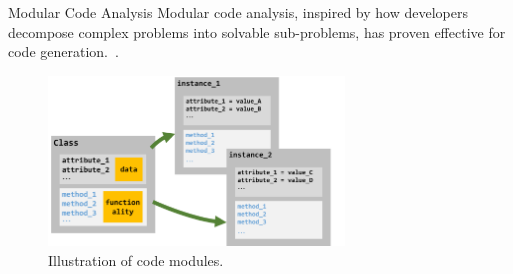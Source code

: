 \begin{frame}{Modular Code Analysis}
    Modular code analysis, inspired by how developers decompose complex problems into solvable sub-problems, has proven effective for code generation.~\cite{le2023codechain}.
    \begin{figure}[!htb]
        \centering
        \includegraphics[width=0.7\textwidth]{img/class_diagram}
        \captionsetup{font=small,labelformat=empty}
        \caption{Illustration of code modules.}
    \end{figure}
\end{frame}
